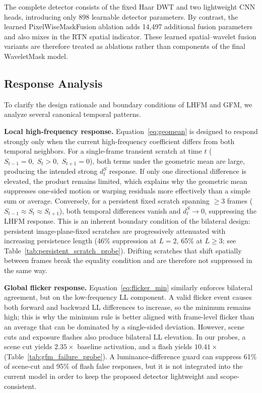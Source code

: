 \documentclass[applsci,article,submit,pdftex,moreauthors]{Definitions/mdpi}
\begin{document}
The complete detector consists of the fixed Haar DWT and two lightweight CNN heads, introducing only 898 learnable detector parameters. By contrast, the learned PixelWiseMaskFusion ablation adds 14,497 additional fusion parameters and also mixes in the RTN spatial indicator. These learned spatial--wavelet fusion variants are therefore treated as ablations rather than components of the final WaveletMask model.

\subsection{Response Analysis}\label{subsec:response_analysis}

To clarify the design rationale and boundary conditions of LHFM and GFM, we analyze several canonical temporal patterns.

\textbf{Local high-frequency response.} Equation~\eqref{eq:geomean} is designed to respond strongly only when the current high-frequency coefficient differs from both temporal neighbors. For a single-frame transient scratch at time $t$ ($S_{t-1}=0,\;S_t>0,\;S_{t+1}=0$), both terms under the geometric mean are large, producing the intended strong $d_t^S$ response. If only one directional difference is elevated, the product remains limited, which explains why the geometric mean suppresses one-sided motion or warping residuals more effectively than a simple sum or average. Conversely, for a persistent fixed scratch spanning $\geq$3 frames ($S_{t-1}\approx S_t\approx S_{t+1}$), both temporal differences vanish and $d_t^S\to0$, suppressing the LHFM response. This is an inherent boundary condition of the bilateral design: persistent image-plane-fixed scratches are progressively attenuated with increasing persistence length (46\% suppression at $L=2$, 65\% at $L\geq3$; see Table~\ref{tab:persistent_scratch_probe}). Drifting scratches that shift spatially between frames break the equality condition and are therefore not suppressed in the same way.

\textbf{Global flicker response.} Equation~\eqref{eq:flicker_min} similarly enforces bilateral agreement, but on the low-frequency LL component. A valid flicker event causes both forward and backward LL differences to increase, so the minimum remains high; this is why the minimum rule is better aligned with frame-level flicker than an average that can be dominated by a single-sided deviation. However, scene cuts and exposure flashes also produce bilateral LL elevation. In our probes, a scene cut yields $2.35\times$ baseline activation, and a flash yields $10.41\times$ (Table~\ref{tab:gfm_failure_probe}). A luminance-difference guard can suppress 61\% of scene-cut and 95\% of flash false responses, but it is not integrated into the current model in order to keep the proposed detector lightweight and scope-consistent.
\end{document}
